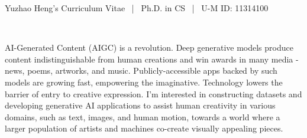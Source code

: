 \documentclass[10pt,a4paper,ragged2e,withhyper]{altacv}
\begin{document}
\vspace*{-3em}
\thispagestyle{titlepage}
\pagestyle{nontitlepage}
\small
{}

Yuzhao Heng's Curriculum Vitae  ~|~ Ph.D. in CS ~|~ U-M ID: 11314100 \par
~\par

\makecvheader{}





AI-Generated Content (AIGC) is a revolution.
Deep generative models produce content indistinguishable from human creations and win awards in many media -
news, poems, artworks, and music.
Publicly-accessible apps backed by such models are growing fast, empowering the imaginative.
Technology lowers the barrier of entry to creative expression.
I'm interested in constructing datasets and developing generative AI applications to assist human creativity in various domains,
such as text, images, and human motion,
towards a world where a larger population of artists and machines co-create visually appealing pieces. \par
\smallskip
\end{document}
